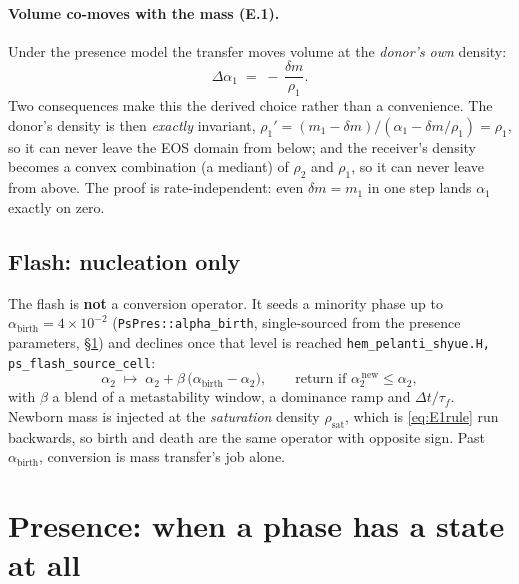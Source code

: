 \documentclass[11pt,a4paper]{article}
\newcommand{\code}[1]{\texttt{\small #1}}
\newcommand{\src}[1]{{\color{gray}\code{#1}}}
\begin{document}
\paragraph{Volume co-moves with the mass (E.1).}
Under the presence model the transfer moves volume at the \emph{donor's own}
density:
\begin{equation}
  \Delta\alpha_1 \;=\; -\,\frac{\delta m}{\rho_1}.
  \label{eq:E1rule}
\end{equation}
Two consequences make this the derived choice rather than a convenience.  The
donor's density is then \emph{exactly} invariant,
$\rho_1' = (m_1-\delta m)/(\alpha_1-\delta m/\rho_1) = \rho_1$, so it can never
leave the EOS domain from below; and the receiver's density becomes a convex
combination (a mediant) of $\rho_2$ and $\rho_1$, so it can never leave from
above.  The proof is rate-independent: even $\delta m = m_1$ in one step lands
$\alpha_1$ exactly on zero.

\subsection{Flash: nucleation only}

The flash is \textbf{not} a conversion operator.  It seeds a minority phase up
to $\alpha_{\mathrm{birth}} = 4\times10^{-2}$ (\code{PsPres::alpha\_birth},
single-sourced from the presence parameters, \S\ref{sec:presence}) and
declines once that level is reached \src{hem\_pelanti\_shyue.H, ps\_flash\_source\_cell}:
\begin{equation}
  \alpha_2 \;\mapsto\; \alpha_2 + \beta\,\bigl(\alpha_{\mathrm{birth}}-\alpha_2\bigr),
  \qquad
  \text{return if } \alpha_2^{\,\mathrm{new}} \le \alpha_2 ,
\end{equation}
with $\beta$ a blend of a metastability window, a dominance ramp and
$\Delta t/\tau_f$.  Newborn mass is injected at the \emph{saturation} density
$\rho_{\mathrm{sat}}$, which is \eqref{eq:E1rule} run backwards, so birth and
death are the same operator with opposite sign.  Past
$\alpha_{\mathrm{birth}}$, conversion is mass transfer's job alone.

\section{Presence: when a phase has a state at all}
\label{sec:presence}
\end{document}
